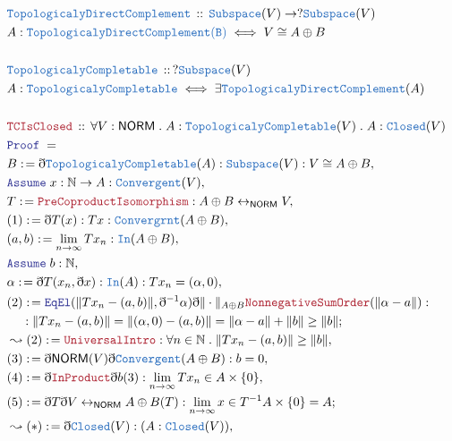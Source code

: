 \documentclass[12pt]{scrartcl}
\newcommand{\TYPE}[1]{\textcolor{NavyBlue}{\mathtt{#1}}}
\newcommand{\LOGIC}[1]{\textcolor{Blue}{\mathtt{#1}}}
\newcommand{\THM}[1]{\textcolor{Maroon}{\mathtt{#1}}}
\renewcommand{\.}{\; . \;}
\newcommand{\de}{: \kern 0.1pc =}
\newcommand{\Theorem}[2]{& \THM{#1} \, :: \, #2 \\ & \Proof = \\ }
\newcommand{\DeclareType}[2]{& \TYPE{#1} \, :: \, #2 \\}
\newcommand{\DefineType}[3]{& #1 : \TYPE{#2} \iff #3 \\}
\newcommand{\NewLine}{\\ & \kern 1pc}
\newcommand{\Page}[1]{\begin{align*} #1 \end{align*} \newpage   }
\newcommand{ \bd }{ \ByDef }
\newcommand{\Nat}{\mathbb{N} }
\newcommand{\ToBij}{\leftrightarrow}
\newcommand{\Say}[3]{& #1 \de #2 : #3, \\}
\newcommand{\Conclude}[3]{& #1 \de #2 : #3; \\}
\newcommand{\Derive}[3]{& \leadsto #1 \de #2 : #3, \\}
\newcommand{\A}{\LOGIC{Assume} \;}
\newcommand{\Assume}[2]{& \A #1 : #2, \\}
\newcommand{\ByDef}{\eth}
\newcommand{\Proof}{\LOGIC{Proof} \; }
\newcommand{\NORM}{\mathsf{NORM}} %
\begin{document}
 \Page{
\DeclareType{TopologicalyDirectComplement}{ \TYPE{Subspace}(V) \to ?\TYPE{Subspace}(V) }
\DefineType{A}{TopologicalyDirectComplement(B)}{V \cong A \oplus B}
\\
\DeclareType{TopologicalyCompletable}{ ?\TYPE{Subspace}(V) }
\DefineType{A}{TopologicalyCompletable}{ \exists \TYPE{TopologicalyDirectComplement}(A)}
\\
\Theorem{TCIsClosed}{ \forall V : \NORM \. A : \TYPE{TopologicalyCompletable}(V) \. A : \TYPE{Closed}(V)}
\Say{B}{\bd \TYPE{TopologicalyCompletable}(A) }{ \TYPE{Subspace}(V) : V \cong A \oplus B }
\Assume{x}{\Nat \to A   : \TYPE{Convergent}(V) }
\Say{T}{\THM{PreCoproductIsomorphism}}{ A \oplus B \ToBij_\NORM V}
\Say{(1)}{\bd T (x)}{Tx : \TYPE{Convergrnt}(A \oplus B)}
\Say{ (a,b) }{ \lim_{n \to \infty} Tx_n }{\TYPE{In}(A \oplus B)}
\Assume{b}{\Nat}
\Say{\alpha}{ \bd T(x_n, \bd x)}{\TYPE{In}(A) : Tx_n = (\alpha, 0)}
\Conclude{(2)}{ \LOGIC{EqEl}( \| Tx_n - (a,b) \| ,\bd^{-1} \alpha) \bd \| \cdot \|_{A \oplus B}
\THM{NonnegativeSumOrder}(\|\alpha - a \|)
 }{ 
 \NewLine : 
 \| Tx_n - (a,b) \| = \| (\alpha,0) - (a,b) \| = \| \alpha - a \| + \| b \| \ge \|b\| }
\Derive{(2)}{\THM{UniversalIntro}}{ \forall n \in \Nat \. \| Tx_n - (a,b)\| \ge \|b\| }
\Say{(3)}{ \bd \NORM(V) \bd \TYPE{Convergent}(A \oplus B) }{ b = 0} 
\Say{(4)}{ \bd \THM{InProduct} \bd b (3)}{ \lim_{n \to \infty} Tx_n \in A \times \{ 0 \} }
\Conclude{(5)  }{ \bd T \bd V \ToBij_\NORM A \oplus B(T)  }{ \lim_{n \to \infty} x \in T^{-1}A \times \{ 0 \} = A}
\Derive{(*)}{\bd \TYPE{Closed}(V)}{(A : \TYPE{Closed}(V) )}  
  }
\end{document}
